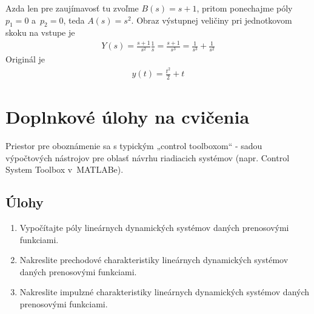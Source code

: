 \documentclass[a4paper, 10pt, ]{article}
\begin{document}
Azda len pre zaujímavosť tu zvoľme $B(s) =  s + 1$, pritom ponechajme póly $p_1 = 0$ a~$p_2 = 0$, teda $A(s) = s^2$. Obraz výstupnej veličiny pri jednotkovom skoku na vstupe je
\begin{align}
    Y(s) = \frac{s + 1}{s^2} \frac{1}{s} = \frac{s + 1}{s^3} = \frac{1}{s^3} + \frac{1}{s^2}
\end{align}
Originál je
\begin{align} \label{fun_PCH_AS2R_v3}
    y(t) = \frac{t^2}{2} + t
\end{align}
















\section{Doplnkové úlohy na cvičenia}

Priestor pre oboznámenie sa s typickým „control toolboxom“ - sadou výpočtových nástrojov pre oblasť návrhu riadiacich systémov (napr. Control System Toolbox v~MATLABe).

\subsection*{Úlohy}

\begin{enumerate}[leftmargin=0pt, labelsep=4mm, itemsep=0pt]

	\item Vypočítajte póly lineárnych dynamických systémov daných prenosovými funkciami.
	
	\item Nakreslite prechodové charakteristiky lineárnych dynamických systémov daných prenosovými funkciami.

    \item Nakreslite impulzné charakteristiky lineárnych dynamických systémov daných prenosovými funkciami.
    
\end{enumerate}
\end{document}
